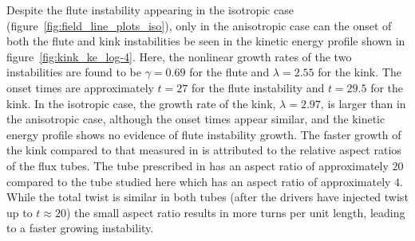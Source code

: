 \documentclass[fleqn,usenatbib]{mnras}
\newcommand{\rs}[2]{{#2}}
\begin{document}
Despite the \rs{fluting}{flute} instability appearing in the isotropic
case (figure~\ref{fig:field_line_plots_iso}), only in the
\rs{switching}{anisotropic} case can the onset of both the
\rs{fluting}{flute} and kink instabilities be seen in the kinetic
energy profile \rs{}{shown in} figure~\ref{fig:kink_ke_log-4}. \rs{where}{Here,} the nonlinear
growth rates of the two instabilities are found to be $\gamma = 0.69$
for the \rs{fluting}{flute} and $\lambda = 2.55$ for the kink. The
onset times are approximately $t=27$ for the \rs{fluting}{flute}
instability and \rs{}{$t=29.5$} for
the kink. In the isotropic case, the growth rate of the kink, $\lambda
= 2.97$, is larger than in the \rs{switching}{anisotropic} case,
although the onset times appear similar, and the kinetic energy
profile shows no evidence of \rs{the growth of the \rs{fluting}{flute}
instability.}{\rs{fluting}{flute} instability growth.} 
\rs{}{}
The faster growth of the kink compared \rs{to, say, that of
  chapter~}{to that measured in}
\citep{quinnEffectAnisotropicViscosity2020} is \rs{due}{attributed} to
the relative aspect ratios of the flux tubes. The tube prescribed in
\rs{chapter~}{} \citep{quinnEffectAnisotropicViscosity2020} has an aspect
ratio of approximately $20$ compared to the tube studied here which
has an aspect ratio of approximately $4$. While the total twist is
similar in both tubes (after the drivers have injected twist up to
$t\approx20$) the small aspect ratio results in more turns per unit
length, \rs{resulting in}{leading to} a faster growing instability. 
\end{document}
